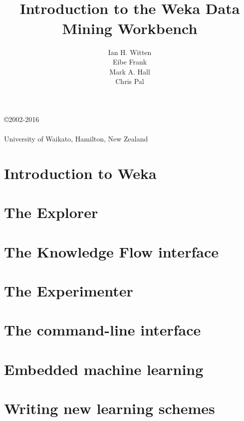 \documentclass[a4paper]{book}
\title{\epsfig{file=images/coat_of_arms.eps,width=10cm}\vspace{3cm}\\Introduction to the Weka Data Mining Workbench}
\author{Ian H. Witten\\Eibe Frank\\Mark A. Hall\\Chris Pal}
\begin{document}
\begin{titlepage}
\maketitle

\thispagestyle{empty}
\center
\begin{table}[b]
\copyright 2002-2016 \\
 \\
University of Waikato, Hamilton, New Zealand \\
\end{table}

\end{titlepage}

\tableofcontents

\chapter{Introduction to Weka}


\chapter{The Explorer}
\label{chapt:explorer}


\chapter{The Knowledge Flow interface}
\label{chapt:knowledge_flow}


\chapter{The Experimenter}
\label{chapt:experimenter}


\chapter{The command-line interface}
\label{chapt:command_line}


\chapter{Embedded machine learning}
\label{chapt:embedded}


\chapter{Writing new learning schemes}
\label{chapt:writing_learning_schemes}

\end{document}
